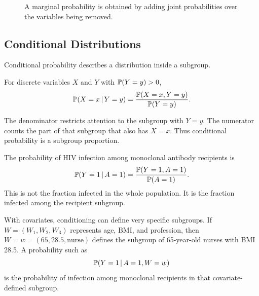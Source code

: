 \begin{figure}[H]
\centering
{}
\caption{A marginal probability is obtained by adding joint probabilities over the variables being removed.}
\end{figure}

\subsection{Conditional Distributions}

Conditional probability describes a distribution inside a subgroup.

\begin{definition}
For discrete variables $X$ and $Y$ with $\mathbb{P}(Y=y)>0$,
\[
\mathbb{P}(X=x\,\vert\, Y=y)
=
\frac{\mathbb{P}(X=x,Y=y)}{\mathbb{P}(Y=y)}.
\]
\end{definition}

The denominator restricts attention to the subgroup with $Y=y$. The numerator counts the part of that subgroup that also has $X=x$. Thus conditional probability is a subgroup proportion.

\begin{example}
The probability of HIV infection among monoclonal antibody recipients is
\[
\mathbb{P}(Y=1\,\vert\, A=1)
=
\frac{\mathbb{P}(Y=1,A=1)}{\mathbb{P}(A=1)}.
\]
This is not the fraction infected in the whole population. It is the fraction infected among the recipient subgroup.
\end{example}

With covariates, conditioning can define very specific subgroups. If $W=(W_1,W_2,W_3)$ represents age, BMI, and profession, then $W=w=(65,28.5,\text{nurse})$ defines the subgroup of 65-year-old nurses with BMI 28.5. A probability such as
\[
\mathbb{P}(Y=1\,\vert\, A=1,W=w)
\]
is the probability of infection among monoclonal recipients in that covariate-defined subgroup.

